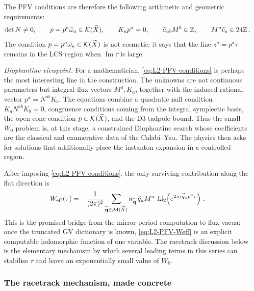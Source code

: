 The PFV conditions are therefore the following arithmetic and
geometric requirements:
\begin{equation}\label{eq:L2-PFV-conditions}
    \det N\neq0,\qquad
    p=p^a\widetilde\omega_a\in\mathcal{K}(\widetilde X),\qquad
    K_ap^a=0,\qquad
    \widetilde a_{ab}M^b\in\mathbb Z,\qquad
    M^a\widetilde c_a\in24\mathbb Z\, .
\end{equation}
The condition $p=p^a\widetilde\omega_a\in\mathcal{K}(\widetilde X)$ is not cosmetic: it says
that the line $z^a=p^a\tau$ remains in the LCS region when
$\operatorname{Im}\tau$ is large.

\medskip
\noindent\emph{Diophantine viewpoint.}
For a mathematician, \eqref{eq:L2-PFV-conditions} is perhaps the
most interesting line in the construction.  The unknowns are not
continuous parameters but integral flux vectors $M^a,K_a$, together
with the induced rational vector $p^a=N^{ab}K_b$.  The equations
combine a quadratic null condition $K_aN^{ab}K_b=0$, congruence
conditions coming from the integral symplectic basis, the open cone
condition $p\in\mathcal{K}(\widetilde X)$, and the D3-tadpole bound.
Thus the small-$W_0$ problem is, at this stage, a constrained
Diophantine search whose coefficients are the classical and
enumerative data of the Calabi--Yau.  The physics then asks for
solutions that additionally place the instanton expansion in a
controlled region.




After imposing
\eqref{eq:L2-PFV-conditions}, the only surviving contribution along
the flat direction is
\begin{equation}\label{eq:L2-PFV-Weff}
    W_{\rm eff}(\tau)
      =
      -\frac{1}{(2\pi)^2}
      \sum_{\widetilde{\mathbf q}\in\mathcal{M}(\widetilde X)}
      n_{\widetilde{\mathbf q}}\,
      \widetilde q_aM^a\,
      \operatorname{Li}_2
      \!\left(
        \mathrm{e}^{2\pi\mathrm{i}\,\widetilde q_ap^a\tau}
      \right)\, .
\end{equation}
This is the promised bridge from the mirror-period computation to
flux vacua: once the truncated GV dictionary is known,
\eqref{eq:L2-PFV-Weff} is an explicit computable holomorphic function
of one variable.  The
racetrack discussion below is the elementary mechanism by which
several leading terms in this series can stabilise $\tau$ and
leave an exponentially small value of $W_0$.

\subsubsection*{The racetrack mechanism, made concrete}


